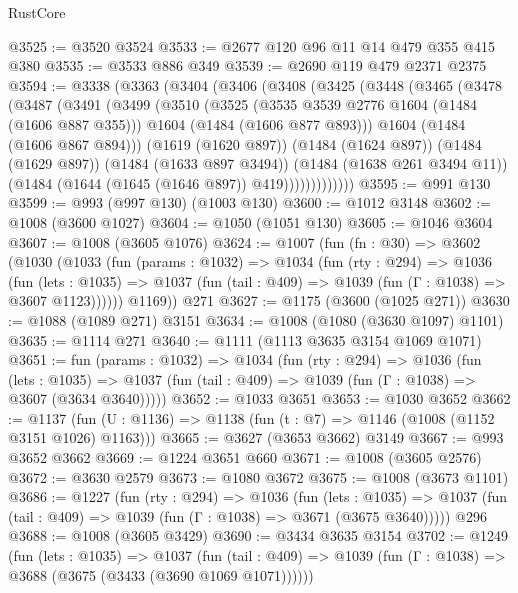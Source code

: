 \begin{lexlean}{RustCore}
\begin{coremodule}
@3525 := @3520 @3524
@3533 := @2677 @120 @96 @11 @14 @479 @355 @415 @380
@3535 := @3533 @886 @349
@3539 := @2690 @119 @479 @2371 @2375
@3594 := @3338
    (@3363
      (@3404
        (@3406
          (@3408
            (@3425
              (@3448
                (@3465
                  (@3478
                    (@3487
                      (@3491
                        (@3499
                          (@3510
                            (@3525
                              (@3535 @3539 @2776 @1604 (@1484 (@1606 @887 @355)))
                              @1604
                              (@1484 (@1606 @877 @893)))
                            @1604
                            (@1484 (@1606 @867 @894)))
                          (@1619 (@1620 @897))
                          (@1484 (@1624 @897))
                          (@1484 (@1629 @897))
                          (@1484 (@1633 @897 @3494))
                          (@1484 (@1638 @261 @3494 @11))
                          (@1484 (@1644 (@1645 (@1646 @897)) @419)))))))))))))
@3595 := @991 @130
@3599 := @993 (@997 @130) (@1003 @130)
@3600 := @1012 @3148
@3602 := @1008 (@3600 @1027)
@3604 := @1050 (@1051 @130)
@3605 := @1046 @3604
@3607 := @1008 (@3605 @1076)
@3624 := @1007
    (fun (fn : @30) =>
    @3602
      (@1030
        (@1033
          (fun (params : @1032) =>
          @1034
            (fun (rty : @294) =>
            @1036
              (fun (lets : @1035) =>
              @1037 (fun (tail : @409) => @1039 (fun (Γ : @1038) => @3607 @1123))))))
        @1169))
    @271
@3627 := @1175 (@3600 (@1025 @271))
@3630 := @1088 (@1089 @271) @3151
@3634 := @1008 (@1080 (@3630 @1097) @1101)
@3635 := @1114 @271
@3640 := @1111 (@1113 @3635 @3154 @1069 @1071)
@3651 := fun (params : @1032) =>
  @1034
    (fun (rty : @294) =>
    @1036
      (fun (lets : @1035) =>
      @1037 (fun (tail : @409) => @1039 (fun (Γ : @1038) => @3607 (@3634 @3640)))))
@3652 := @1033 @3651
@3653 := @1030 @3652
@3662 := @1137 (fun (U : @1136) => @1138 (fun (t : @7) => @1146 (@1008 (@1152 @3151 @1026) @1163)))
@3665 := @3627 (@3653 @3662) @3149
@3667 := @993 @3652 @3662
@3669 := @1224 @3651 @660
@3671 := @1008 (@3605 @2576)
@3672 := @3630 @2579
@3673 := @1080 @3672
@3675 := @1008 (@3673 @1101)
@3686 := @1227
    (fun (rty : @294) =>
    @1036
      (fun (lets : @1035) =>
      @1037 (fun (tail : @409) => @1039 (fun (Γ : @1038) => @3671 (@3675 @3640)))))
    @296
@3688 := @1008 (@3605 @3429)
@3690 := @3434 @3635 @3154
@3702 := @1249
    (fun (lets : @1035) =>
    @1037
      (fun (tail : @409) => @1039 (fun (Γ : @1038) => @3688 (@3675 (@3433 (@3690 @1069 @1071))))))

\end{coremodule}
\end{lexlean}
